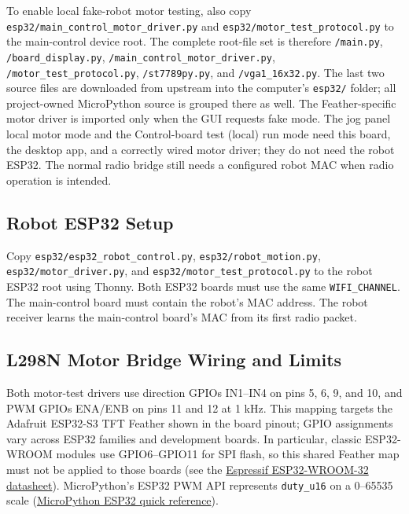 \documentclass{article}
\begin{document}
To enable local fake-robot motor testing, also copy \texttt{esp32/main\_control\_motor\_driver.py} and \texttt{esp32/motor\_test\_protocol.py} to the main-control device root. The complete root-file set is therefore \texttt{/main.py}, \texttt{/board\_display.py}, \texttt{/main\_control\_motor\_driver.py}, \texttt{/motor\_test\_protocol.py}, \texttt{/st7789py.py}, and \texttt{/vga1\_16x32.py}. The last two source files are downloaded from upstream into the computer's \texttt{esp32/} folder; all project-owned MicroPython source is grouped there as well. The Feather-specific motor driver is imported only when the GUI requests fake mode. The jog panel local motor mode and the Control-board test (local) run mode need this board, the desktop app, and a correctly wired motor driver; they do not need the robot ESP32. The normal radio bridge still needs a configured robot MAC when radio operation is intended.

\subsection{Robot ESP32 Setup}

Copy \texttt{esp32/esp32\_robot\_control.py}, \texttt{esp32/robot\_motion.py}, \texttt{esp32/motor\_driver.py}, and \texttt{esp32/motor\_test\_protocol.py} to the robot ESP32 root using Thonny. Both ESP32 boards must use the same \texttt{WIFI\_CHANNEL}. The main-control board must contain the robot's MAC address. The robot receiver learns the main-control board's MAC from its first radio packet.

\subsection{L298N Motor Bridge Wiring and Limits}

Both motor-test drivers use direction GPIOs IN1--IN4 on pins 5, 6, 9, and 10, and PWM GPIOs ENA/ENB on pins 11 and 12 at 1 kHz. This mapping targets the Adafruit ESP32-S3 TFT Feather shown in the board pinout; GPIO assignments vary across ESP32 families and development boards. In particular, classic ESP32-WROOM modules use GPIO6--GPIO11 for SPI flash, so this shared Feather map must not be applied to those boards (see the \href{https://www.espressif.com/sites/default/files/documentation/esp32-wroom-32_datasheet_en.pdf}{Espressif ESP32-WROOM-32 datasheet}). MicroPython's ESP32 PWM API represents \texttt{duty\_u16} on a 0--65535 scale (\href{https://docs.micropython.org/en/v1.28.0/esp32/quickref.html}{MicroPython ESP32 quick reference}).
\end{document}
